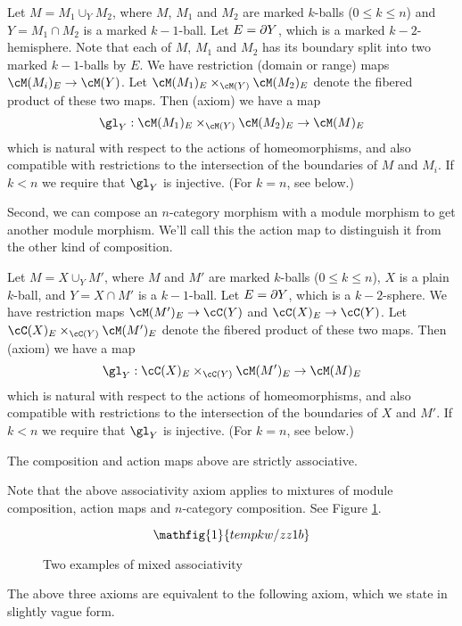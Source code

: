 {Let $M = M_1 \cup_Y M_2$, where $M$, $M_1$ and $M_2$ are marked $k$-balls ($0\le k\le n$)
and $Y = M_1\cap M_2$ is a marked $k{-}1$-ball.
Let $E = \partial Y$, which is a marked $k{-}2$-hemisphere.
Note that each of $M$, $M_1$ and $M_2$ has its boundary split into two marked $k{-}1$-balls by $E$.
We have restriction (domain or range) maps $\cM(M_i)_E \to \cM(Y)$.
Let $\cM(M_1)_E \times_{\cM(Y)} \cM(M_2)_E$ denote the fibered product of these two maps. 
Then (axiom) we have a map
\[
	\gl_Y : \cM(M_1)_E \times_{\cM(Y)} \cM(M_2)_E \to \cM(M)_E
\]
which is natural with respect to the actions of homeomorphisms, and also compatible with restrictions
to the intersection of the boundaries of $M$ and $M_i$.
If $k < n$ we require that $\gl_Y$ is injective.
(For $k=n$, see below.)}



Second, we can compose an $n$-category morphism with a module morphism to get another
module morphism.
We'll call this the action map to distinguish it from the other kind of composition.

{Let $M = X \cup_Y M'$, where $M$ and $M'$ are marked $k$-balls ($0\le k\le n$),
$X$ is a plain $k$-ball,
and $Y = X\cap M'$ is a $k{-}1$-ball.
Let $E = \partial Y$, which is a $k{-}2$-sphere.
We have restriction maps $\cM(M')_E \to \cC(Y)$ and $\cC(X)_E\to \cC(Y)$.
Let $\cC(X)_E \times_{\cC(Y)} \cM(M')_E$ denote the fibered product of these two maps. 
Then (axiom) we have a map
\[
	\gl_Y :\cC(X)_E \times_{\cC(Y)} \cM(M')_E \to \cM(M)_E
\]
which is natural with respect to the actions of homeomorphisms, and also compatible with restrictions
to the intersection of the boundaries of $X$ and $M'$.
If $k < n$ we require that $\gl_Y$ is injective.
(For $k=n$, see below.)}

{The composition and action maps above are strictly associative.}

Note that the above associativity axiom applies to mixtures of module composition,
action maps and $n$-category composition.
See Figure \ref{zzz1b}.

\begin{figure}[!ht]
\begin{equation*}
\mathfig{1}{tempkw/zz1b}
\end{equation*}
\caption{Two examples of mixed associativity}
\label{zzz1b}
\end{figure}


The above three axioms are equivalent to the following axiom,
which we state in slightly vague form.

